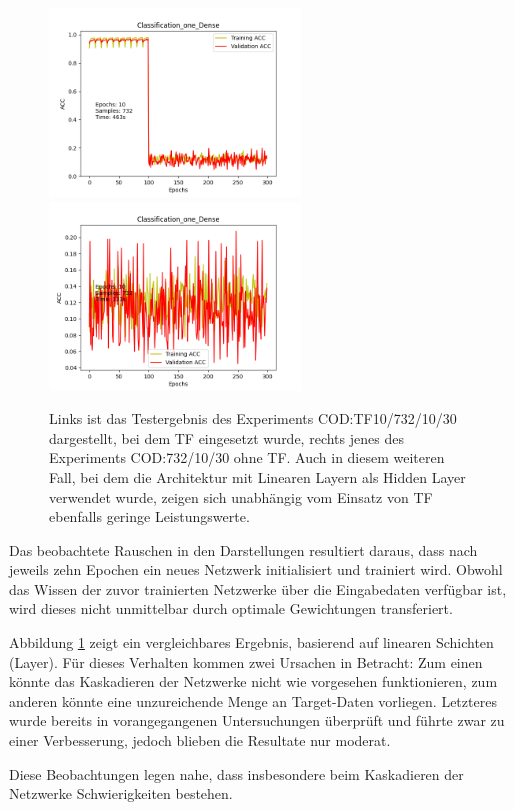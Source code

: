 \begin{figure}[htpb]
    \includegraphics[height=5cm]{../../Plots/ba_plots/classTF/cod_tr.png}
    \includegraphics[height=5cm]{../../Plots/ba_plots/classTF/wocod_tr.png}
    \caption{\label{fig:cod_tr} 
    \small{Links ist das Testergebnis des Experiments COD:TF10/732/10/30 dargestellt, bei dem TF eingesetzt wurde, rechts jenes des 
    Experiments COD:732/10/30 ohne TF. Auch in diesem weiteren Fall, bei dem die Architektur mit Linearen Layern als Hidden Layer verwendet 
    wurde, zeigen sich unabhängig vom Einsatz von TF ebenfalls geringe Leistungswerte.}}
\end{figure}

Das beobachtete Rauschen in den Darstellungen resultiert daraus, dass nach jeweils zehn Epochen ein neues Netzwerk initialisiert und trainiert 
wird. Obwohl das Wissen der zuvor trainierten Netzwerke über die Eingabedaten verfügbar ist, wird dieses nicht unmittelbar durch optimale 
Gewichtungen transferiert.

Abbildung \ref{fig:cod_tr} zeigt ein vergleichbares Ergebnis, basierend auf linearen Schichten (Layer). Für dieses Verhalten kommen zwei Ursachen in 
Betracht: Zum einen könnte das Kaskadieren der Netzwerke nicht wie vorgesehen funktionieren, zum anderen könnte eine unzureichende Menge an 
Target-Daten vorliegen. Letzteres wurde bereits in vorangegangenen Untersuchungen überprüft und führte zwar zu einer Verbesserung, jedoch 
blieben die Resultate nur moderat.

Diese Beobachtungen legen nahe, dass insbesondere beim Kaskadieren der Netzwerke Schwierigkeiten bestehen.
